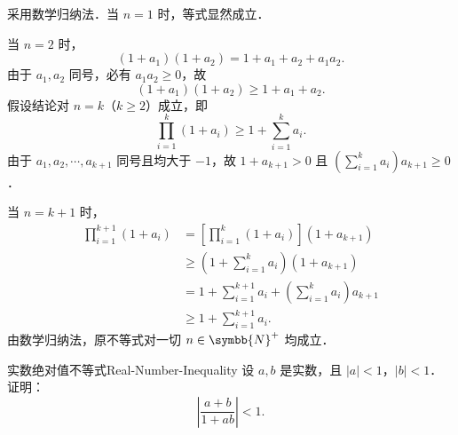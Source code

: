\begin{myproof}
    采用数学归纳法．当 $n = 1$ 时，等式显然成立．

    当 $n = 2$ 时，
    \begin{equation}
        (1 + a_1)(1 + a_2) = 1 + a_1 + a_2 + a_1 a_2.
    \end{equation}
    由于 $a_1, a_2$ 同号，必有 $a_1 a_2 \geqslant 0$，故
    \begin{equation}
        (1 + a_1)(1 + a_2) \geqslant 1 + a_1 + a_2.
    \end{equation}
    假设结论对 $n = k$（$k \geqslant 2$）成立，即
    \begin{equation}
        \prod_{i=1}^k (1 + a_i) \geqslant 1 + \sum_{i=1}^k a_i.
    \end{equation}
    由于 $a_1, a_2, \cdots, a_{k+1}$ 同号且均大于 $-1$，故 $1 + a_{k+1} > 0$ 且 $\left(\sum_{i=1}^k a_i\right) a_{k+1} \geqslant 0$．

    当 $n = k + 1$ 时，
    \begin{equation}
        \begin{aligned}
            \prod_{i=1}^{k+1} (1 + a_i) & = \left[\prod_{i=1}^k (1 + a_i)\right](1 + a_{k+1})                \\
                                        & \geqslant \left(1 + \sum_{i=1}^k a_i\right)(1 + a_{k+1})           \\
                                        & = 1 + \sum_{i=1}^{k+1} a_i + \left(\sum_{i=1}^k a_i\right) a_{k+1} \\
                                        & \geqslant 1 + \sum_{i=1}^{k+1} a_i.
        \end{aligned}
    \end{equation}
    由数学归纳法，原不等式对一切 $n \in \symbb{N}^+$ 均成立．
\end{myproof}

\begin{problem}{实数绝对值不等式}{Real-Number-Inequality}
    设 $a, b$ 是实数，且 $|a| < 1$，$|b| < 1$．证明：
    \begin{equation}
        \left| \frac{a + b}{1 + ab} \right| < 1.
    \end{equation}
\end{problem}

